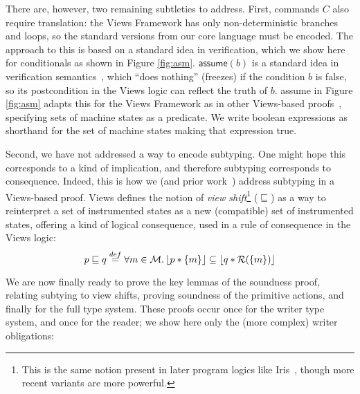 There are, however, two remaining subtleties to address.  First,
commands $C$ also require translation: the Views Framework has only non-deterministic branches and loops, so the standard versions from our core language must be encoded.  The approach to this is based on a standard idea in verification, which we show here for conditionals as shown in Figure \ref{fig:asm}. $\textsf{assume}(b)$ is a standard idea in verification semantics~\cite{Barnett:2005:BMR:2090458.2090481,Muller:2016:VVI:2963187.2963190}, which ``does nothing'' (freezes) if the condition $b$ is false, so its postcondition in the Views logic can reflect the truth of $b$.  \textsf{assume} in Figure \ref{fig:asm} adapts this for the Views Framework as in other Views-based proofs~\cite{oopsla12,toplas17}, specifying sets of machine states as a predicate. We write boolean expressions as shorthand for the set of machine states making that expression true.  

Second, we have not addressed a way to encode subtyping.  One might hope this corresponds to a kind of implication, and therefore subtyping corresponds to consequence.  Indeed, this is how we (and prior work~\cite{oopsla12,toplas17}) address subtyping in a Views-based proof.
Views defines the notion of \emph{view shift}\footnote{This is the same notion present in later program logics like Iris~\cite{krebbers2017essence}, though more recent variants are more powerful.} ($\sqsubseteq$) as a way to reinterpret a set of instrumented states as a new (compatible) set of instrumented states, offering a kind of logical consequence, used in a rule of consequence in the Views logic:
\[ p \sqsubseteq q \stackrel{def}{=} \forall m\in\mathcal{M} \ldotp \lfloor p * \{ m \} \rfloor \subseteq \lfloor q* \mathcal{R}(\{m\})\rfloor\]

We are now finally ready to prove the key lemmas of the soundness proof, relating subtying to view shifts, proving soundness of the primitive actions, and finally for the full type system.  These proofs occur once for the writer type system, and once for the reader; we show here only the (more complex) writer obligations:

